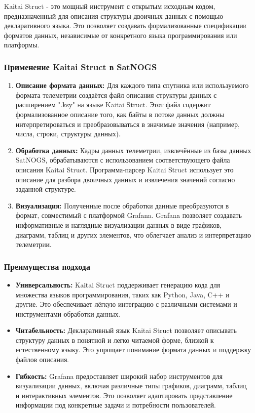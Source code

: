 \documentclass[12pt, a4paper]{extreport}
\begin{document}
Kaitai Struct - это мощный инструмент с открытым исходным кодом, предназначенный для описания структуры двоичных данных с помощью декларативного языка.  Это позволяет создавать формализованные спецификации форматов данных,  независимые от конкретного языка программирования или платформы.

\subsubsection{Применение Kaitai Struct в SatNOGS}

\begin{enumerate}
\item \textbf{Описание формата данных:} Для каждого типа спутника или используемого формата телеметрии создаётся файл описания структуры данных с расширением ".ksy" на языке Kaitai Struct. Этот файл содержит формализованное описание того, как байты в потоке данных должны интерпретироваться и преобразовываться в значимые значения (например, числа, строки, структуры данных).
\item \textbf{Обработка данных:} Кадры данных телеметрии, извлечённые из базы данных SatNOGS, обрабатываются с использованием соответствующего файла описания Kaitai Struct.  Программа-парсер Kaitai Struct использует это описание для разбора двоичных данных и извлечения значений согласно заданной структуре.
\item \textbf{Визуализация:} Полученные после обработки данные преобразуются в формат, совместимый с платформой Grafana.  Grafana  позволяет создавать информативные и наглядные  визуализации данных в виде графиков, диаграмм, таблиц и других элементов,  что облегчает анализ и интерпретацию телеметрии.
\end{enumerate}

\subsubsection{Преимущества подхода}

\begin{itemize}[label={--}] %
\item \textbf{Универсальность:} Kaitai Struct поддерживает генерацию кода для множества языков программирования, таких как Python, Java, C++ и другие. Это обеспечивает лёгкую интеграцию с различными системами и инструментами обработки данных.
\item \textbf{Читабельность:}  Декларативный язык Kaitai Struct позволяет описывать структуру данных в понятной и легко читаемой форме,  близкой к естественному языку. Это упрощает понимание формата данных и поддержку файлов описания.
\item \textbf{Гибкость:} Grafana предоставляет широкий набор инструментов для визуализации данных, включая различные типы графиков, диаграмм, таблиц и интерактивных элементов.  Это позволяет адаптировать представление информации под конкретные задачи и потребности пользователей.
\end{itemize}
\end{document}
